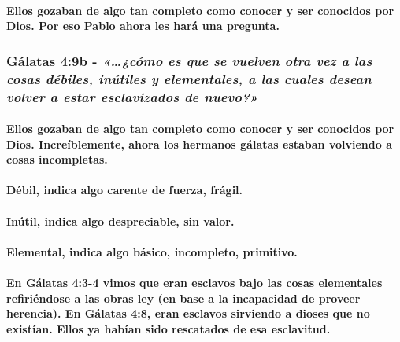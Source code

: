 \documentclass[11a pt,twoside]{article}
\newcommand{\scripture}[1]{%
  {\fontsize{12pt}{16pt}\selectfont\ScriptureFont\itshape #1}%
}
\let\oldsubsubsection\subsubsection
\renewcommand{\subsubsection}{\needspace{4\baselineskip}\oldsubsubsection}
\let\oldparagraph\paragraph
\renewcommand{\paragraph}{\needspace{3\baselineskip}\oldparagraph}
\begin{document}
\paragraph{Ellos gozaban de algo tan completo como conocer y ser
conocidos por Dios. Por eso Pablo ahora les hará una
pregunta.}\label{ellos-gozaban-de-algo-tan-completo-como-conocer-y-ser-conocidos-por-dios.-por-eso-pablo-ahora-les-haruxe1-una-pregunta.}

\subsubsection{\texorpdfstring{Gálatas 4:9b -
\scripture{«…¿cómo es que se vuelven otra vez a las cosas débiles, inútiles y elementales, a las cuales desean volver a estar esclavizados de nuevo?»}}{Gálatas 4:9b - }}\label{guxe1latas-49b---cuxf3mo-es-que-se-vuelven-otra-vez-a-las-cosas-duxe9biles-inuxfatiles-y-elementales-a-las-cuales-desean-volver-a-estar-esclavizados-de-nuevo}

\paragraph{Ellos gozaban de algo tan completo como conocer y ser
conocidos por Dios. Increíblemente, ahora los hermanos gálatas estaban
volviendo a cosas
incompletas.}\label{ellos-gozaban-de-algo-tan-completo-como-conocer-y-ser-conocidos-por-dios.-increuxedblemente-ahora-los-hermanos-guxe1latas-estaban-volviendo-a-cosas-incompletas.}

\paragraph{Débil, indica algo carente de fuerza,
frágil.}\label{duxe9bil-indica-algo-carente-de-fuerza-fruxe1gil.}

\paragraph{Inútil, indica algo despreciable, sin
valor.}\label{inuxfatil-indica-algo-despreciable-sin-valor.}

\paragraph{Elemental, indica algo básico, incompleto,
primitivo.}\label{elemental-indica-algo-buxe1sico-incompleto-primitivo.}

\paragraph{En Gálatas 4:3-4 vimos que eran esclavos bajo las cosas
elementales refiriéndose a las obras ley (en base a la incapacidad de
proveer herencia). En Gálatas 4:8, eran esclavos sirviendo a dioses que
no existían. Ellos ya habían sido rescatados de esa
esclavitud.}\label{en-guxe1latas-43-4-vimos-que-eran-esclavos-bajo-las-cosas-elementales-refiriuxe9ndose-a-las-obras-ley-en-base-a-la-incapacidad-de-proveer-herencia.-en-guxe1latas-48-eran-esclavos-sirviendo-a-dioses-que-no-existuxedan.-ellos-ya-habuxedan-sido-rescatados-de-esa-esclavitud.}
\end{document}
